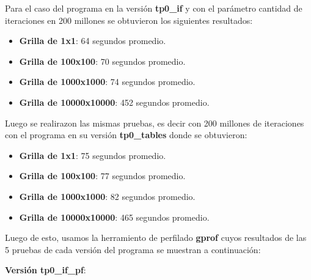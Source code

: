 \documentclass[a4paper, 10pt, twoside, notitlepage]{article}
\begin{document}
Para el caso del programa en la versión \textbf{tp0\_if} y con el parámetro cantidad de iteraciones en 200 millones se obtuvieron los siguientes resultados:

\begin{itemize} 
\item[] \textbf{Grilla de 1x1}: 64 segundos promedio.
\item[] \textbf{Grilla de 100x100}: 70 segundos promedio.
\item[] \textbf{Grilla de 1000x1000}: 74 segundos promedio.
\item[] \textbf{Grilla de 10000x10000}: 452 segundos promedio.
\end{itemize}

Luego se realirazon las mismas pruebas, es decir con 200 millones de iteraciones con el programa en su versión \textbf{tp0\_tables} donde se obtuvieron: 
\begin{itemize} 
\item[] \textbf{Grilla de 1x1}: 75 segundos promedio.
\item[] \textbf{Grilla de 100x100}: 77 segundos promedio.
\item[] \textbf{Grilla de 1000x1000}: 82 segundos promedio.
\item[] \textbf{Grilla de 10000x10000}: 465 segundos promedio.
\end{itemize}

Luego de esto, usamos la herramiento de perfilado \textbf{gprof} cuyos resultados de las 5 pruebas de cada versión del programa se muestran a continuación:

\textbf{Versión tp0\_if\_pf}:
\end{document}
